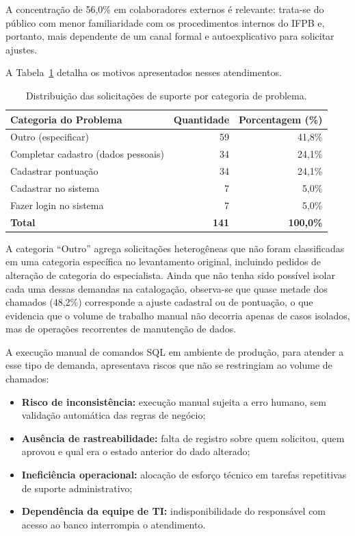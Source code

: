 A concentração de 56,0\% em colaboradores externos é relevante: trata-se do público com menor familiaridade com os procedimentos internos do IFPB e, portanto, mais dependente de um canal formal e autoexplicativo para solicitar ajustes.

A Tabela~\ref{tab:categoria_problema} detalha os motivos apresentados nesses atendimentos.

\begin{table}[htbp]
    \centering
    \caption[Distribuição dos chamados por categoria de problema]{Distribuição das solicitações de suporte por categoria de problema.}
    \label{tab:categoria_problema}
    \begin{tabular}{lrr}
        \toprule
        \textbf{Categoria do Problema} & \textbf{Quantidade} & \textbf{Porcentagem (\%)} \\
        \midrule
        Outro (especificar) & 59 & 41,8\% \\
        Completar cadastro (dados pessoais) & 34 & 24,1\% \\
        Cadastrar pontuação & 34 & 24,1\% \\
        Cadastrar no sistema & 7 & 5,0\% \\
        Fazer login no sistema & 7 & 5,0\% \\
        \midrule
        \textbf{Total} & \textbf{141} & \textbf{100,0\%} \\
        \bottomrule
    \end{tabular}
\end{table}
\newpage
A categoria ``Outro'' agrega solicitações heterogêneas que não foram classificadas em uma categoria específica no levantamento original, incluindo pedidos de alteração de categoria do especialista. Ainda que não tenha sido possível isolar cada uma dessas demandas na catalogação, observa-se que quase metade dos chamados (48,2\%) corresponde a ajuste cadastral ou de pontuação, o que evidencia que o volume de trabalho manual não decorria apenas de casos isolados, mas de operações recorrentes de manutenção de dados.

A execução manual de comandos SQL em ambiente de produção, para atender a esse tipo de demanda, apresentava riscos que não se restringiam ao volume de chamados:

\begin{itemize}
    \item \textbf{Risco de inconsistência:} execução manual sujeita a erro humano, sem validação automática das regras de negócio;
    \item \textbf{Ausência de rastreabilidade:} falta de registro sobre quem solicitou, quem aprovou e qual era o estado anterior do dado alterado;
    \item \textbf{Ineficiência operacional:} alocação de esforço técnico em tarefas repetitivas de suporte administrativo;
    \item \textbf{Dependência da equipe de TI:} indisponibilidade do responsável com acesso ao banco interrompia o atendimento.
\end{itemize}

